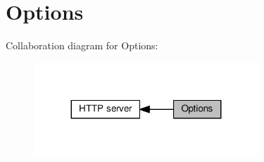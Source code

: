 \hypertarget{group__httpd__opts}{}\section{Options}
\label{group__httpd__opts}
Collaboration diagram for Options\+:
\nopagebreak
\begin{figure}[H]
\begin{center}
\leavevmode
\includegraphics[width=239pt]{group__httpd__opts}
\end{center}
\end{figure}
